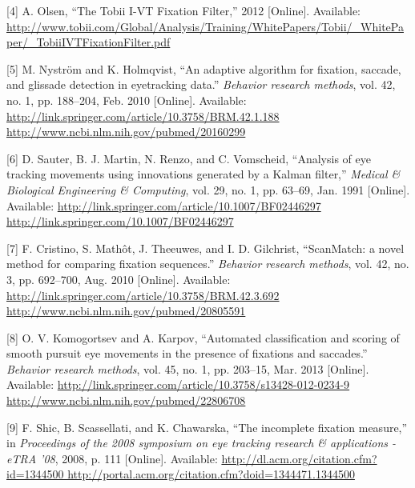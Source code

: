 \documentclass[brazil,]{report}
\begin{document}
{[}4{]} A. Olsen, ``The Tobii I-VT Fixation Filter,'' 2012 {[}Online{]}.
Available:
\url{http://www.tobii.com/Global/Analysis/Training/WhitePapers/Tobii/_WhitePaper/_TobiiIVTFixationFilter.pdf}

{[}5{]} M. Nyström and K. Holmqvist, ``An adaptive algorithm for
fixation, saccade, and glissade detection in eyetracking data.''
\emph{Behavior research methods}, vol. 42, no. 1, pp. 188--204, Feb.
2010 {[}Online{]}. Available:
\href{http://link.springer.com/article/10.3758/BRM.42.1.188 http://www.ncbi.nlm.nih.gov/pubmed/20160299}{http://link.springer.com/article/10.3758/BRM.42.1.188
http://www.ncbi.nlm.nih.gov/pubmed/20160299}

{[}6{]} D. Sauter, B. J. Martin, N. Renzo, and C. Vomscheid, ``Analysis
of eye tracking movements using innovations generated by a Kalman
filter,'' \emph{Medical \& Biological Engineering \& Computing}, vol.
29, no. 1, pp. 63--69, Jan. 1991 {[}Online{]}. Available:
\href{http://link.springer.com/article/10.1007/BF02446297 http://link.springer.com/10.1007/BF02446297}{http://link.springer.com/article/10.1007/BF02446297
http://link.springer.com/10.1007/BF02446297}

{[}7{]} F. Cristino, S. Mathôt, J. Theeuwes, and I. D. Gilchrist,
``ScanMatch: a novel method for comparing fixation sequences.''
\emph{Behavior research methods}, vol. 42, no. 3, pp. 692--700, Aug.
2010 {[}Online{]}. Available:
\href{http://link.springer.com/article/10.3758/BRM.42.3.692 http://www.ncbi.nlm.nih.gov/pubmed/20805591}{http://link.springer.com/article/10.3758/BRM.42.3.692
http://www.ncbi.nlm.nih.gov/pubmed/20805591}

{[}8{]} O. V. Komogortsev and A. Karpov, ``Automated classification and
scoring of smooth pursuit eye movements in the presence of fixations and
saccades.'' \emph{Behavior research methods}, vol. 45, no. 1, pp.
203--15, Mar. 2013 {[}Online{]}. Available:
\href{http://link.springer.com/article/10.3758/s13428-012-0234-9 http://www.ncbi.nlm.nih.gov/pubmed/22806708}{http://link.springer.com/article/10.3758/s13428-012-0234-9
http://www.ncbi.nlm.nih.gov/pubmed/22806708}

{[}9{]} F. Shic, B. Scassellati, and K. Chawarska, ``The incomplete
fixation measure,'' in \emph{Proceedings of the 2008 symposium on eye
tracking research \& applications - eTRA '08}, 2008, p. 111
{[}Online{]}. Available:
\href{http://dl.acm.org/citation.cfm?id=1344500 http://portal.acm.org/citation.cfm?doid=1344471.1344500}{http://dl.acm.org/citation.cfm?id=1344500
http://portal.acm.org/citation.cfm?doid=1344471.1344500}
\end{document}
